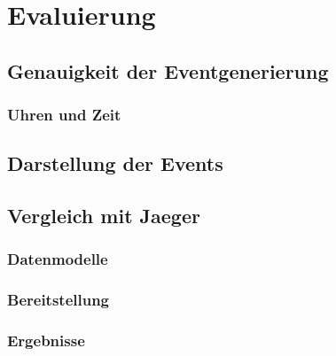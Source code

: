 %

\chapter{Evaluierung}
\section{Genauigkeit der Eventgenerierung}
\subsection{Uhren und Zeit}
\section{Darstellung der Events}
\section{Vergleich mit Jaeger}
\subsection{Datenmodelle}
\subsection{Bereitstellung}
\subsection{Ergebnisse}
